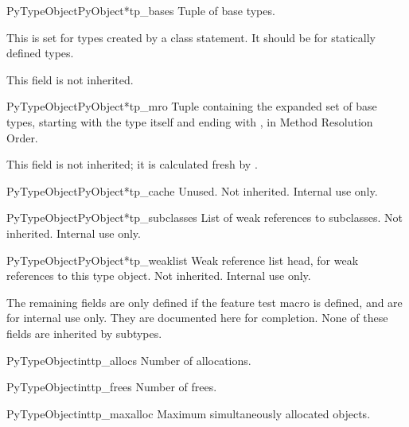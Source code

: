 \begin{cmemberdesc}{PyTypeObject}{PyObject*}{tp_bases}
  Tuple of base types.

  This is set for types created by a class statement.  It should be
  \NULL{} for statically defined types.

  This field is not inherited.
\end{cmemberdesc}

\begin{cmemberdesc}{PyTypeObject}{PyObject*}{tp_mro}
  Tuple containing the expanded set of base types, starting with the
  type itself and ending with , in Method Resolution
  Order.

  This field is not inherited; it is calculated fresh by
  .
\end{cmemberdesc}

\begin{cmemberdesc}{PyTypeObject}{PyObject*}{tp_cache}
  Unused.  Not inherited.  Internal use only.
\end{cmemberdesc}

\begin{cmemberdesc}{PyTypeObject}{PyObject*}{tp_subclasses}
  List of weak references to subclasses.  Not inherited.  Internal
  use only.
\end{cmemberdesc}

\begin{cmemberdesc}{PyTypeObject}{PyObject*}{tp_weaklist}
  Weak reference list head, for weak references to this type
  object.  Not inherited.  Internal use only.
\end{cmemberdesc}

The remaining fields are only defined if the feature test macro
 is defined, and are for internal use only.
They are documented here for completion.  None of these fields are
inherited by subtypes.

\begin{cmemberdesc}{PyTypeObject}{int}{tp_allocs}
  Number of allocations.
\end{cmemberdesc}

\begin{cmemberdesc}{PyTypeObject}{int}{tp_frees}
  Number of frees.
\end{cmemberdesc}

\begin{cmemberdesc}{PyTypeObject}{int}{tp_maxalloc}
  Maximum simultaneously allocated objects.
\end{cmemberdesc}

